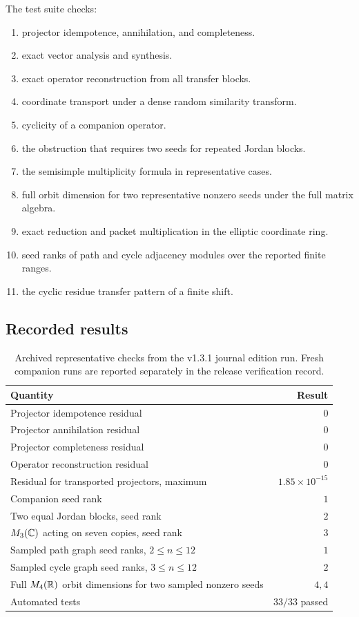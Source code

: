 The test suite checks:
\begin{enumerate}[label=(\roman*)]
\item projector idempotence, annihilation, and completeness.
\item exact vector analysis and synthesis.
\item exact operator reconstruction from all transfer blocks.
\item coordinate transport under a dense random similarity transform.
\item cyclicity of a companion operator.
\item the obstruction that requires two seeds for repeated Jordan blocks.
\item the semisimple multiplicity formula in representative cases.
\item full orbit dimension for two representative nonzero seeds under the full matrix algebra.
\item exact reduction and packet multiplication in the elliptic coordinate ring.
\item seed ranks of path and cycle adjacency modules over the reported finite ranges.
\item the cyclic residue transfer pattern of a finite shift.
\end{enumerate}

\subsection{Recorded results}

\begin{table}[htbp]
\centering
\caption{Archived representative checks from the v1.3.1 journal edition run. Fresh companion runs are reported separately in the release verification record.}
\label{tab:results}
\begin{tabular}{L{0.57\textwidth}r}
\toprule
Quantity & Result \\
\midrule
Projector idempotence residual & $0$ \\
Projector annihilation residual & $0$ \\
Projector completeness residual & $0$ \\
Operator reconstruction residual & $0$ \\
Residual for transported projectors, maximum & $1.85\times10^{-15}$ \\
Companion seed rank & $1$ \\
Two equal Jordan blocks, seed rank & $2$ \\
$M_3(\mathbb C)$ acting on seven copies, seed rank & $3$ \\
Sampled path graph seed ranks, $2\le n\le12$ & $1$ \\
Sampled cycle graph seed ranks, $3\le n\le12$ & $2$ \\
Full $M_4(\mathbb R)$ orbit dimensions for two sampled nonzero seeds & $4,4$ \\
Automated tests & $33/33$ passed \\
\bottomrule
\end{tabular}
\end{table}

